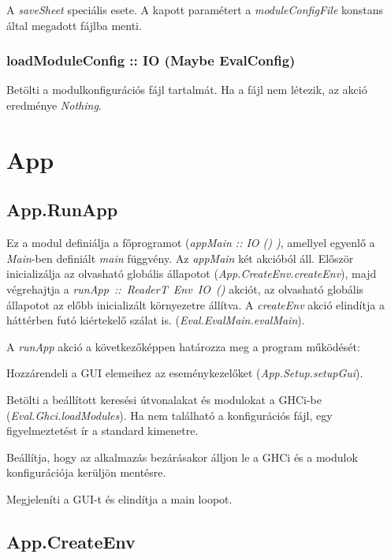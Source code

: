A \textit{saveSheet} speciális esete. A kapott paramétert a \textit{moduleConfigFile} konstans által megadott fájlba menti.

\subsubsection{loadModuleConfig :: IO (Maybe EvalConfig)}

Betölti a modulkonfigurációs fájl tartalmát. Ha a fájl nem létezik, az akció eredménye \textit{Nothing}.

\section{App}

\subsection{App.RunApp}

Ez a modul definiálja a főprogramot (\textit{appMain :: IO () )}, amellyel egyenlő a \textit{Main}-ben definiált \textit{main} függvény. Az \textit{appMain} két akcióból áll. Először inicializálja az olvasható globális állapotot (\textit{App.CreateEnv.createEnv}), majd végrehajtja a \mbox{\textit{runApp :: ReaderT Env IO ()}} akciót, az olvasható globális állapotot az előbb inicializált környezetre állítva. A 
\textit{createEnv} akció elindítja a háttérben futó kiértekelő szálat is. (\textit{Eval.EvalMain.evalMain}).

A \textit{runApp} akció a következőképpen határozza meg a program működését:
\begin{compactenum}
	\item Hozzárendeli a GUI elemeihez az eseménykezelőket (\textit{App.Setup.setupGui}).
	\item Betölti a beállított keresési útvonalakat és modulokat a GHCi-be (\textit{Eval.Ghci.loadModules}). Ha nem található a konfigurációs fájl, egy figyelmeztetést ír a standard kimenetre.
	\item Beállítja, hogy az alkalmazás bezárásakor álljon le a GHCi és a modulok konfigurációja kerüljön mentésre.
	\item Megjeleníti a GUI-t és elindítja a main loopot. 
\end{compactenum}

\subsection{App.CreateEnv}

